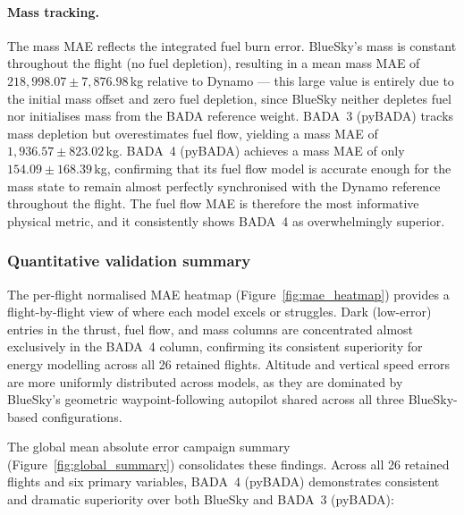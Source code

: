 \paragraph{Mass tracking.}
The mass MAE reflects the integrated fuel burn error. BlueSky's mass is constant throughout the flight (no fuel depletion), resulting in a mean mass MAE of $218{,}998.07 \pm 7{,}876.98$\,kg relative to Dynamo --- this large value is entirely due to the initial mass offset and zero fuel depletion, since BlueSky neither depletes fuel nor initialises mass from the BADA reference weight. BADA~3 (pyBADA) tracks mass depletion but overestimates fuel flow, yielding a mass MAE of $1{,}936.57 \pm 823.02$\,kg. BADA~4 (pyBADA) achieves a mass MAE of only $154.09 \pm 168.39$\,kg, confirming that its fuel flow model is accurate enough for the mass state to remain almost perfectly synchronised with the Dynamo reference throughout the flight. The fuel flow MAE is therefore the most informative physical metric, and it consistently shows BADA~4 as overwhelmingly superior.

\subsubsection{Quantitative validation summary}

The per-flight normalised MAE heatmap (Figure~\ref{fig:mae_heatmap}) provides a flight-by-flight view of where each model excels or struggles. Dark (low-error) entries in the thrust, fuel flow, and mass columns are concentrated almost exclusively in the BADA~4 column, confirming its consistent superiority for energy modelling across all 26 retained flights. Altitude and vertical speed errors are more uniformly distributed across models, as they are dominated by BlueSky's geometric waypoint-following autopilot shared across all three BlueSky-based configurations.

The global mean absolute error campaign summary (Figure~\ref{fig:global_summary}) consolidates these findings. Across all 26 retained flights and six primary variables, BADA~4 (pyBADA) demonstrates consistent and dramatic superiority over both BlueSky and BADA~3 (pyBADA):

